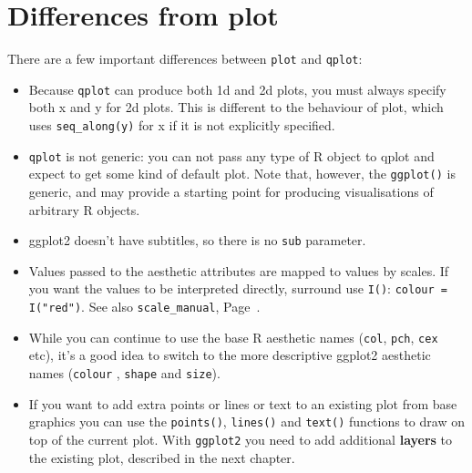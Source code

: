 \section{Differences from plot}
\label{sec:plot_diffs}

There are a few important differences between {\tt plot} and {\tt qplot}:

\begin{itemize}
  \item Because {\tt qplot} can produce both 1d and 2d plots, you must always specify both x and y for 2d plots.  This is different to the behaviour of plot, which uses {\tt seq\_along(y)} for x if it is not explicitly specified.
  
  \item {\tt qplot} is not generic: you can not pass any type of R object to qplot and expect to get some kind of default plot.  Note that, however, the {\tt ggplot()} is generic, and may provide a starting point for producing visualisations of arbitrary R objects.
  
  \item ggplot2 doesn't have subtitles, so there is no {\tt sub} parameter.    
  
  \item Values passed to the aesthetic attributes are mapped to values by scales.  If you want the values to be interpreted directly, surround use {\tt I()}: {\tt colour = I("red")}.  See also {\tt scale\_manual}, Page~\pageref{sec:scale_special}.
  
  \item While you can continue to use the base R aesthetic names ({\tt col},  {\tt pch}, {\tt cex} etc), it's a good idea to switch to the more descriptive ggplot2 aesthetic names ({\tt colour} , {\tt shape} and {\tt size}).

  \item If you want to add extra points or lines or text to an existing plot from base graphics you can use the {\tt points()}, {\tt lines()} and {\tt text()} functions to draw on top of the current plot.  With {\tt ggplot2} you need to add additional {\bf layers} to the existing plot, described in the next chapter.
  
\end{itemize}


